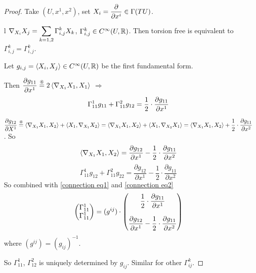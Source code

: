 \begin{proof}
    Take  $ (U,x^1,x^2) $, set  $ X_i=\displaystyle\frac{\partial }{\partial x^i}\in \Gamma(TU) $. 
    
    l $ \nabla_{X_i}X_j=\displaystyle\sum_{k=1,2}\Gamma_{i,j}^kX_k $,  $ \Gamma_{i,j}^k\in C^\infty(U,\mathbb R) $. Then torsion free is equivalent   to  $ \Gamma_{i,j}^k=\Gamma_{i,j}^k $.
    
    Let  $ g_{i,j}=\left<X_i,X_j\right>\in C^\infty(U,\mathbb R) $  be the first fundamental form.
    
    Then  $ \dps\frac{\partial g_{11}}{\partial x^1}\overset{\text{\ding{195}}}{=}2\<\nabla_{X_1}X_1,X_1\> $ $ \Rightarrow $  
    \begin{equation}\label{connection eq1}
        \Gamma_{11}^1g_{11}+\Gamma_{11}^2g_{12}=\displaystyle\frac{1}{2}\cdot\frac{\partial g_{11}}{\partial x^1} 
    \end{equation}
    
    $ \dps\frac{\partial g_{12}}{\partial X^1}\overset{\text{\ding{195}}}{=}\<\nabla_{X_1}X_1,X_2\>+\<X_1,\nabla_{X_1}X_2\>=\<\nabla_{X_1}X_1,X_2\>+\<X_1,\nabla_{X_2}X_1\>=\<\nabla_{X_1}X_1,X_2\>+\dps\frac{1}{2}\cdot\frac{\partial g_{11}}{\partial x^2} $. So 
    \begin{equation}
        \left<\nabla_{X_1}X_1,X_2\right>=\frac{\partial g_{12}}{\partial x^1}-\frac{1}{2}\cdot\frac{\partial g_{11}}{\partial x^2}
    \end{equation}
    \ie 
    \begin{equation}\label{connection eq2}
        \Gamma_{11}^1g_{12}+\Gamma_{11}^2g_{22}=\frac{\partial g_{12}}{\partial x^1}-\frac{1}{2}\cdot\frac{\partial g_{11}}{\partial x^2}
    \end{equation}
    So combined with \eqref{connection eq1} and \eqref{connection eq2}
    \begin{equation}
        \begin{pmatrix}
            \Gamma_{11}^1\\
            \Gamma_{11}^1
        \end{pmatrix}=(g^{ij})\cdot\begin{pmatrix}
            \displaystyle\frac{1}{2}\cdot\frac{\partial g_{11}}{\partial x^1}\\
    
            \\
            \displaystyle\frac{\partial g_{12}}{\partial x^1}-\frac{1}{2}\cdot\frac{\partial g_{11}}{\partial x^2}
        \end{pmatrix}
    \end{equation}where  $ (g^{ij})=(g_{ij})^{-1} $.
    
    So  $ \Gamma_{11}^1 $,  $ \Gamma_{12}^2 $ is uniquely determined by  $ g_{ij} $. Similar for other  $ \Gamma_{ij}^k $.
\end{proof}

